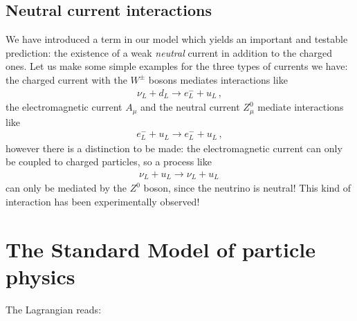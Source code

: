 \documentclass[main.tex]{subfiles}
\begin{document}
\subsection{Neutral current interactions}


We have introduced a term in our model which yields an important and testable prediction: the existence of a weak \emph{neutral} current in addition to the charged ones.
Let us make some simple examples for the three types of currents we have: the charged current with the \(W^{\pm}\) bosons mediates interactions like 
%
\begin{align}
\nu_{L} + d_L \to e^{-}_{L} + u_L
\,,
\end{align}
%
the electromagnetic current \(A_{\mu }\) and the neutral current \(Z^{0}_{\mu }\) mediate interactions like 
%
\begin{align}
e^{-}_{L} + u_L \to e^{-}_{L} + u_L
\,,
\end{align}
%
however there is a distinction to be made: the electromagnetic current can only be coupled to charged particles, so a process like 
%
\begin{align}
\nu_{L} + u_L \to \nu_{L} + u_L
\,
\end{align}
%
can only be mediated by the \(Z^{0}\) boson, since the neutrino is neutral!
This kind of interaction has been experimentally observed!


\section{The Standard Model of particle physics}

The Lagrangian reads:
%
\end{document}
